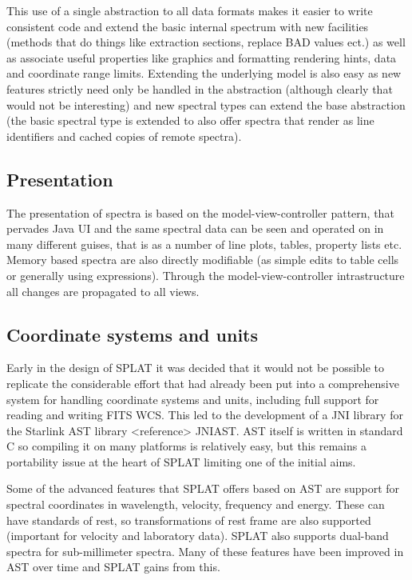 \documentclass[final,authoryear,5p,times,twocolumn]{elsarticle}
\begin{document}
This use of a single abstraction to all data formats makes it easier to write
consistent code and extend the basic internal spectrum with new facilities
(methods that do things like extraction sections, replace BAD values ect.) as
well as associate useful properties like graphics and formatting rendering
hints, data and coordinate range limits. Extending the underlying model is
also easy as new features strictly need only be handled in the abstraction
(although clearly that would not be interesting) and new spectral types can
extend the base abstraction (the basic spectral type is extended to also offer
spectra that render as line identifiers and cached copies of remote spectra). 


\subsection{Presentation}

The presentation of spectra is based on the model-view-controller pattern,
that pervades Java UI and the same spectral data can be seen and operated on
in many different guises, that is as a number of line plots, tables, property
lists etc. Memory based spectra are also directly modifiable (as simple edits
to table cells or generally using expressions). Through the
model-view-controller intrastructure all changes are propagated to all views.


\subsection{Coordinate systems and units}

Early in the design of SPLAT it was decided that it would not be possible to
replicate the considerable effort that had already been put into a
comprehensive system for handling coordinate systems and units, including full
support for reading and writing FITS WCS. This led to the development of a JNI
library for the Starlink AST library <reference> JNIAST. AST itself is written
in standard C so compiling it on many platforms is relatively easy, but this
remains a portability issue at the heart of SPLAT limiting one of the initial
aims.

Some of the advanced features that SPLAT offers based on AST are support for
spectral coordinates in wavelength, velocity, frequency and energy. These can
have standards of rest, so transformations of rest frame are also supported
(important for velocity and laboratory data). SPLAT also supports dual-band
spectra for sub-millimeter spectra. Many of these features have been improved
in AST over time and SPLAT gains from this.
\end{document}
